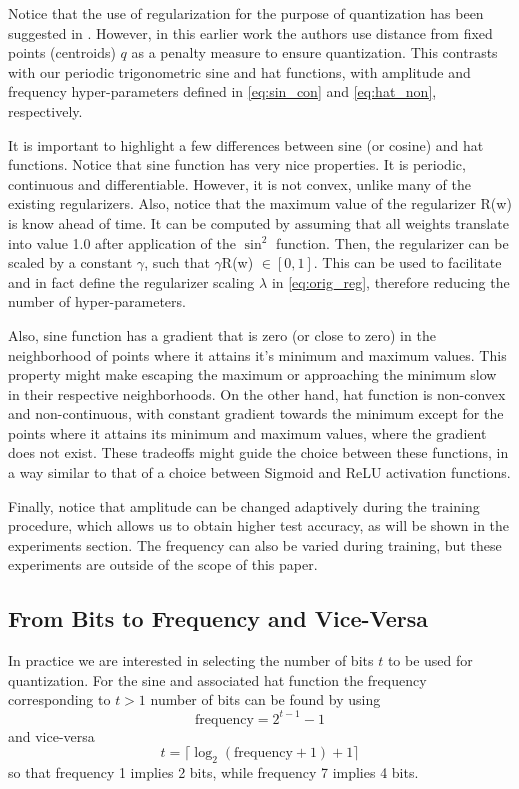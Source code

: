 \documentclass{article}
\begin{document}
Notice that the use of regularization for the purpose of quantization has been suggested in \cite{Hung2015}. However, in this earlier work the authors use distance from fixed points (centroids) $q$ as a penalty measure to ensure quantization. This contrasts with our periodic trigonometric sine and hat functions, with amplitude and frequency hyper-parameters defined in \eqref{eq:sin_con} and \eqref{eq:hat_non}, respectively.

It is important to highlight a few differences between sine (or cosine) and hat functions. Notice that sine function has very nice properties. It is periodic, continuous and differentiable. However, it is not convex, unlike many of the existing regularizers. Also, notice that the maximum value of the regularizer R(w) is know ahead of time. It can be computed by assuming that all weights translate into value 1.0 after application of the $\sin^2$ function. Then, the regularizer can be scaled by a constant $\gamma$, such that $\gamma$R(w) $\in [0,1]$. This can be used to facilitate and in fact define the regularizer scaling $\lambda$ in \eqref{eq:orig_reg}, therefore reducing the number of hyper-parameters.

Also, sine function has a gradient that is zero (or close to zero) in the neighborhood of points where it attains it's minimum and maximum values. This property might make escaping the maximum or approaching the minimum slow in their respective neighborhoods. On the other hand, hat function is non-convex and non-continuous, with constant gradient towards the minimum except for the points where it attains its minimum and maximum values, where the gradient does not exist. These tradeoffs might guide the choice between these functions, in a way similar to that of a choice between Sigmoid and ReLU activation functions.

Finally, notice that amplitude can be changed adaptively during the training procedure, which allows us to obtain higher test accuracy, as will be shown in the experiments section. The frequency can also be varied during training, but these experiments are outside of the scope of this paper.

\subsection{From Bits to Frequency and Vice-Versa}
In practice we are interested in selecting the number of bits $t$ to be used for quantization. For the sine and associated hat function the frequency corresponding to $t>1$ number of bits can be found by using
\begin{equation}
\text{frequency} =  2^{t - 1} - 1
\end{equation}
and vice-versa
\begin{equation}
t = \lceil \log_2 (\text{frequency} + 1) + 1 \rceil
\end{equation}
so that frequency 1 implies 2 bits, while frequency 7 implies 4 bits.
\end{document}
